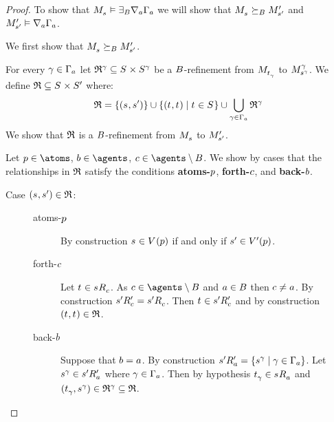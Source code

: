 \begin{proof}
To show that $\kPModel{\kStateS} \entails \somerefsBs \coversA \Gamma_\agentA$ we will show that $\kPModel{\kStateS} \simulatesBs \kPModelP{\kStateSP}$ and $\kPModelP{\kStateSP} \entails \coversA \Gamma_\agentA$.

We first show that $\kPModel{\kStateS} \simulatesBs \kPModelP{\kStateSP}$.

For every $\gamma \in \Gamma_\agentA$ let $\refinement^\gamma \subseteq \kStates \times \kStates[\gamma]$ be a $\agentsB$-refinement from $\kPModel{\kStateT_\gamma}$ to $\kPModel[\gamma]{\kStateS[\gamma]}$.
We define $\refinement \subseteq \kStates \times \kStatesP$ where:
$$
\refinement = \{(\kStateS, \kStateSP)\} \cup \{(\kStateT, \kStateT) \mid \kStateT \in \kStates\} \cup \bigcup_{\gamma \in \Gamma_\agentA} \refinement^\gamma
$$
We show that $\refinement$ is a $\agentsB$-refinement from $\kPModel{\kStateS}$ to $\kPModelP{\kStateSP}$.

Let $\atomP \in \atoms$, $\agentB \in \agents$, $\agentC \in \agents \setminus \agentsB$.
We show by cases that the relationships in $\refinement$ satisfy the conditions {\bf atoms-$\atomP$}, {\bf forth-$\agentC$}, and {\bf back-$\agentB$}.

\begin{description}
    \item[Case $(\kStateS, \kStateSP) \in \refinement$:]
        \hfill
        \begin{description}
            \item[atoms-$\atomP$] 
                By construction $\kStateS \in \kValuation(\atomP)$ if and only if $\kStateSP \in \kValuationP(\atomP)$.
            \item[forth-$\agentC$]
                Let $\kStateT \in \kSuccessorsC{\kStateS}$.
                As $\agentC \in \agents \setminus \agentsB$ and $\agentA \in \agentsB$ then $\agentC \neq \agentA$.
                By construction $\kSuccessorsPC{\kStateSP} = \kSuccessorsC{\kStateSP}$.
                Then $\kStateT \in \kSuccessorsPC{\kStateSP}$ and by construction $(\kStateT, \kStateT) \in \refinement$.
            \item[back-$\agentB$]
                Suppose that $\agentB = \agentA$.
                By construction $\kSuccessorsPA{\kStateSP} = \{\kStateS[\gamma] \mid \gamma \in \Gamma_\agentA\}$.
                Let $\kStateS[\gamma] \in \kSuccessorsPA{\kStateSP}$ where $\gamma \in \Gamma_\agentA$.
                Then by hypothesis $\kStateT_\gamma \in \kSuccessorsA{\kStateS}$ and $(\kStateT_\gamma, \kStateS[\gamma]) \in \refinement^\gamma \subseteq \refinement$.


\end{description}
\end{description}
\end{proof}

